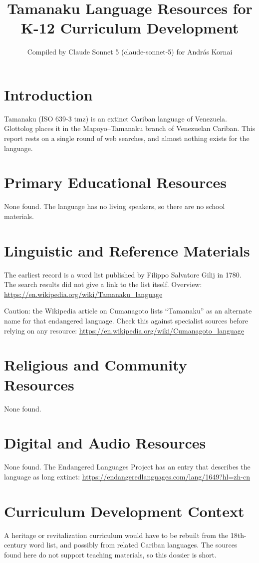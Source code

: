 \documentclass[12pt]{article}
\title{Tamanaku Language Resources for K-12 Curriculum Development}
\author{Compiled by Claude Sonnet 5 (claude-sonnet-5) for Andr\'as Kornai}
\date{}
\begin{document}
\maketitle

\section{Introduction}
Tamanaku (ISO 639-3 tmz) is an extinct Cariban language of Venezuela. Glottolog places it in the Mapoyo--Tamanaku branch of Venezuelan Cariban. This report rests on a single round of web searches, and almost nothing exists for the language.

\section{Primary Educational Resources}
None found. The language has no living speakers, so there are no school materials.

\section{Linguistic and Reference Materials}
The earliest record is a word list published by Filippo Salvatore Gilij in 1780. The search results did not give a link to the list itself. Overview: \url{https://en.wikipedia.org/wiki/Tamanaku_language}

Caution: the Wikipedia article on Cumanagoto lists ``Tamanaku'' as an alternate name for that endangered language. Check this against specialist sources before relying on any resource: \url{https://en.wikipedia.org/wiki/Cumanagoto_language}

\section{Religious and Community Resources}
None found.

\section{Digital and Audio Resources}
None found. The Endangered Languages Project has an entry that describes the language as long extinct: \url{https://endangeredlanguages.com/lang/1649?hl=zh-cn}

\section{Curriculum Development Context}
A heritage or revitalization curriculum would have to be rebuilt from the 18th-century word list, and possibly from related Cariban languages. The sources found here do not support teaching materials, so this dossier is short.
\end{document}
